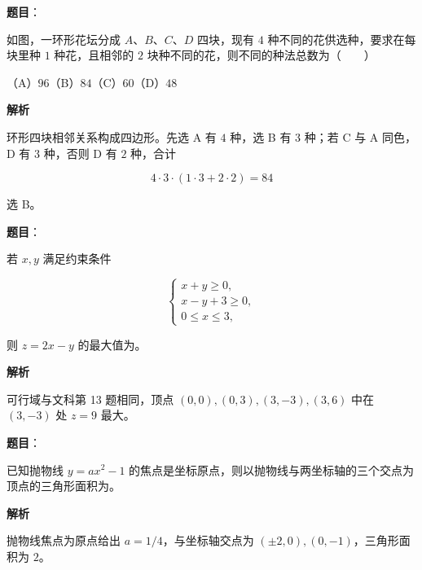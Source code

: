 \begin{answer}

\textbf{题目}：

如图，一环形花坛分成 $A\text{、}B\text{、}C\text{、}D$ 四块，现有 $4$ 种不同的花供选种，要求在每块里种 $1$ 种花，且相邻的 $2$ 块种不同的花，则不同的种法总数为\mbox{（　　）}
\nopagebreak[4]
\begin{center}\end{center}
\nopagebreak[4]
（A）$96$\quad（B）$84$\quad（C）$60$\quad（D）$48$

\textbf{解析}

环形四块相邻关系构成四边形。先选 A 有 $4$ 种，选 B 有 $3$ 种；若 C 与 A 同色，D 有 $3$ 种，否则 D 有 $2$ 种，合计

\nopagebreak[4]
\[
4\cdot3\cdot(1\cdot3+2\cdot2)=84
\]

选 B。


\end{answer}
\begin{answer}

\textbf{题目}：

若 $x,y$ 满足约束条件

\nopagebreak[4]
\[
\begin{cases}
x+y\geqslant0,\\
x-y+3\geqslant0,\\
0\leqslant x\leqslant3,
\end{cases}
\]

则 $z=2x-y$ 的最大值为\gkblank{}。

\textbf{解析}

可行域与文科第 13 题相同，顶点 $(0,0),(0,3),(3,-3),(3,6)$ 中在 $(3,-3)$ 处 $z=9$ 最大。


\end{answer}
\begin{answer}

\textbf{题目}：

已知抛物线 $y=ax^2-1$ 的焦点是坐标原点，则以抛物线与两坐标轴的三个交点为顶点的三角形面积为\gkblank{}。

\textbf{解析}

抛物线焦点为原点给出 $a=1/4$，与坐标轴交点为 $(\pm2,0),(0,-1)$，三角形面积为 $2$。


\end{answer}
